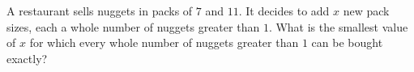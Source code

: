 A restaurant sells nuggets in packs of $7$ and $11$. It decides to add $x$ new pack sizes, each a whole number of nuggets greater than $1$. What is the smallest value of $x$ for which every whole number of nuggets greater than $1$ can be bought exactly?
